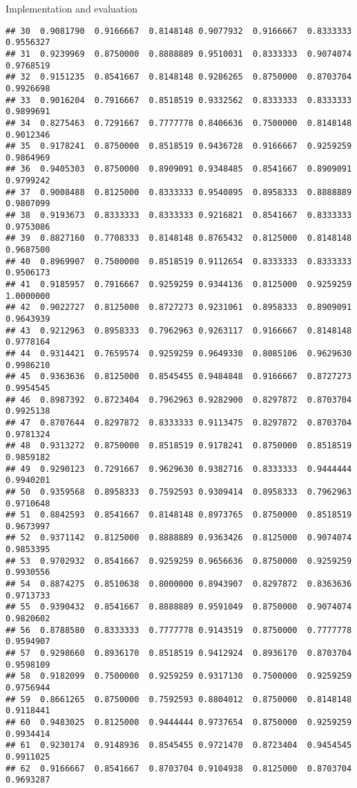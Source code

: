 \documentclass[
  ignorenonframetext,
]{beamer}
\begin{document}
\begin{frame}[fragile]{Implementation and evaluation}
\begin{verbatim}
## 30  0.9081790  0.9166667  0.8148148 0.9077932  0.9166667  0.8333333 0.9556327
## 31  0.9239969  0.8750000  0.8888889 0.9510031  0.8333333  0.9074074 0.9768519
## 32  0.9151235  0.8541667  0.8148148 0.9286265  0.8750000  0.8703704 0.9926698
## 33  0.9016204  0.7916667  0.8518519 0.9332562  0.8333333  0.8333333 0.9899691
## 34  0.8275463  0.7291667  0.7777778 0.8406636  0.7500000  0.8148148 0.9012346
## 35  0.9178241  0.8750000  0.8518519 0.9436728  0.9166667  0.9259259 0.9864969
## 36  0.9405303  0.8750000  0.8909091 0.9348485  0.8541667  0.8909091 0.9799242
## 37  0.9008488  0.8125000  0.8333333 0.9540895  0.8958333  0.8888889 0.9807099
## 38  0.9193673  0.8333333  0.8333333 0.9216821  0.8541667  0.8333333 0.9753086
## 39  0.8827160  0.7708333  0.8148148 0.8765432  0.8125000  0.8148148 0.9687500
## 40  0.8969907  0.7500000  0.8518519 0.9112654  0.8333333  0.8333333 0.9506173
## 41  0.9185957  0.7916667  0.9259259 0.9344136  0.8125000  0.9259259 1.0000000
## 42  0.9022727  0.8125000  0.8727273 0.9231061  0.8958333  0.8909091 0.9643939
## 43  0.9212963  0.8958333  0.7962963 0.9263117  0.9166667  0.8148148 0.9778164
## 44  0.9314421  0.7659574  0.9259259 0.9649330  0.8085106  0.9629630 0.9986210
## 45  0.9363636  0.8125000  0.8545455 0.9484848  0.9166667  0.8727273 0.9954545
## 46  0.8987392  0.8723404  0.7962963 0.9282900  0.8297872  0.8703704 0.9925138
## 47  0.8707644  0.8297872  0.8333333 0.9113475  0.8297872  0.8703704 0.9781324
## 48  0.9313272  0.8750000  0.8518519 0.9178241  0.8750000  0.8518519 0.9859182
## 49  0.9290123  0.7291667  0.9629630 0.9382716  0.8333333  0.9444444 0.9940201
## 50  0.9359568  0.8958333  0.7592593 0.9309414  0.8958333  0.7962963 0.9710648
## 51  0.8842593  0.8541667  0.8148148 0.8973765  0.8750000  0.8518519 0.9673997
## 52  0.9371142  0.8125000  0.8888889 0.9363426  0.8125000  0.9074074 0.9853395
## 53  0.9702932  0.8541667  0.9259259 0.9656636  0.8750000  0.9259259 0.9930556
## 54  0.8874275  0.8510638  0.8000000 0.8943907  0.8297872  0.8363636 0.9713733
## 55  0.9390432  0.8541667  0.8888889 0.9591049  0.8750000  0.9074074 0.9820602
## 56  0.8788580  0.8333333  0.7777778 0.9143519  0.8750000  0.7777778 0.9594907
## 57  0.9298660  0.8936170  0.8518519 0.9412924  0.8936170  0.8703704 0.9598109
## 58  0.9182099  0.7500000  0.9259259 0.9317130  0.7500000  0.9259259 0.9756944
## 59  0.8661265  0.8750000  0.7592593 0.8804012  0.8750000  0.8148148 0.9118441
## 60  0.9483025  0.8125000  0.9444444 0.9737654  0.8750000  0.9259259 0.9934414
## 61  0.9230174  0.9148936  0.8545455 0.9721470  0.8723404  0.9454545 0.9911025
## 62  0.9166667  0.8541667  0.8703704 0.9104938  0.8125000  0.8703704 0.9693287

\end{verbatim}
\end{frame}
\end{document}
